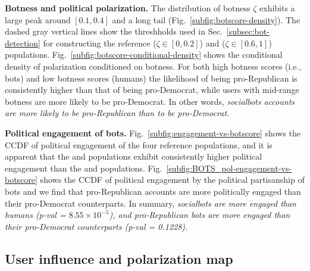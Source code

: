 \textbf{Botness and political polarization.}
The distribution of botness $\zeta$ exhibits a large peak around $[0.1, 0.4]$ and a long tail (Fig.~\ref{subfig:botscore-density}). 
The dashed gray vertical lines show the threshholds used in Sec.~\ref{subsec:bot-detection} for constructing the reference \Human ($\zeta \in [0, 0.2]$) and \Bot ($\zeta \in [0.6, 1]$) populations.
Fig.~\ref{subfig:botscore-conditional-density} shows the conditional density of polarization conditioned on botness.
For both high botness scores (i.e., bots) and low botness scores (humans) the likelihood of being pro-Republican is consistently higher than that of being pro-Democrat, while users with mid-range botness are more likely to be pro-Democrat.
In other words, \emph{socialbots accounts are more likely to be pro-Republican than to be pro-Democrat}.

\textbf{Political engagement of bots.}
Fig.~\ref{subfig:engagement-vs-botscore} shows the CCDF of political engagement of the four reference populations, and it is apparent that the \Bot and \Suspended populations exhibit consistently higher political engagement than the \Human and \Protected populations. 
Fig.~\ref{subfig:BOTS_pol-engagement-vs-botscore} shows the CCDF of political engagement by the political partisanship of bots and we find that pro-Republican \Bot accounts are more politically engaged than their pro-Democrat counterparts.
In summary, \emph{socialbots are more engaged than humans (p-val = $8.55 \times 10^{-5}$), and pro-Republican bots are more engaged than their pro-Democrat counterparts (p-val = 0.1228)}.





\subsection{User influence and polarization map}
\label{subsec:user-influence-results}

